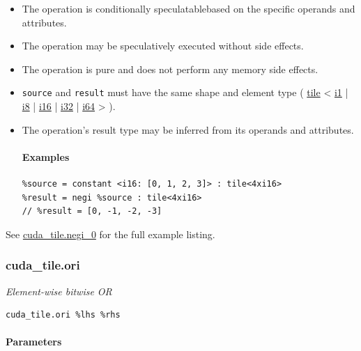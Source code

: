 \documentclass{article}
\begin{document}
\begin{itemize}
\item The operation is conditionally speculatablebased on the specific operands and attributes.
\item The operation may be speculatively executed without side effects.
\item The operation is pure and does not perform any memory side effects.
\item \texttt{source} and \texttt{result} must have the same shape and element type ( \href{https://docs.nvidia.com/cuda/tile-ir/latest/sections/types.html#type-tile}{tile} < \href{https://docs.nvidia.com/cuda/tile-ir/latest/sections/types.html#subsection-element-types}{i1} | \href{https://docs.nvidia.com/cuda/tile-ir/latest/sections/types.html#subsection-element-types}{i8} | \href{https://docs.nvidia.com/cuda/tile-ir/latest/sections/types.html#subsection-element-types}{i16} | \href{https://docs.nvidia.com/cuda/tile-ir/latest/sections/types.html#subsection-element-types}{i32} | \href{https://docs.nvidia.com/cuda/tile-ir/latest/sections/types.html#subsection-element-types}{i64} > ).
\item The operation's result type may be inferred from its operands and attributes.


\paragraph{Examples}

\begin{lstlisting}
%source = constant <i16: [0, 1, 2, 3]> : tile<4xi16>
%result = negi %source : tile<4xi16>
// %result = [0, -1, -2, -3]
\end{lstlisting}

\end{itemize}
See \href{https://docs.nvidia.com/cuda/tile-ir/latest/sections/appendix.html#example-cuda-tile-negi-0}{cuda\_tile.negi\_0} for the full example listing.



\subsubsection{cuda\_tile.ori}

\textit{Element-wise bitwise OR}


\begin{lstlisting}
cuda_tile.ori %lhs %rhs
\end{lstlisting}

\paragraph{Parameters}
\end{document}
